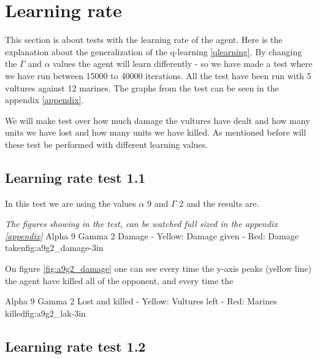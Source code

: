 \section{Learning rate}
This section is about tests with the learning rate of the agent. Here is the explanation about the generalization of the q-learning \ref{qlearning}.
By changing the $\Gamma$ and $\alpha$ values the agent will learn differently - so we have made a test where we have run between 15000 to 40000 iterations. All the test have been run with 5 vultures against 12 marines. The graphs from the test can be seen in the appendix \ref{appendix}.

We will make test over how much damage the vultures have dealt and how many units we have lost and how many units we have killed. As mentioned before will these test be performed with different learning values. 

\subsection*{Learning rate test 1.1}
In this test we are using the values $\alpha$ 9 and $\Gamma$ 2 and the results are.


\textit{The figures showing in the test, can be watched full sized in the appendix \ref{appendix}} 
			{Alpha 9 Gamma 2 Damage - Yellow: Damage given - Red: Damage taken}{fig:a9g2_damage}{-3in}

On figure \ref{fig:a9g2_damage} one can see every time the y-axis peaks (yellow line) the agent have killed all of the opponent, and every time the 


			{Alpha 9 Gamma 2 Lost and killed - Yellow: Vultures left - Red: Marines killed}{fig:a9g2_lak}{-3in}



\subsection*{Learning rate test 1.2}


%
%
%

